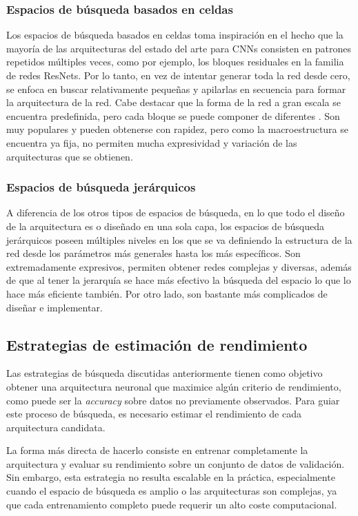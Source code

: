 \subsubsection{Espacios de búsqueda basados en celdas}
Los espacios de búsqueda basados en celdas toma inspiración en el hecho que la mayoría de las arquitecturas del estado del arte para CNNs consisten en patrones repetidos múltiples veces, como por ejemplo, los bloques residuales en la familia de redes ResNets. Por lo tanto, en vez de intentar generar toda la red desde cero, se enfoca en buscar  relativamente pequeñas y apilarlas en secuencia para formar la arquitectura de la red. Cabe destacar que la forma de la red a gran escala se encuentra predefinida, pero cada bloque se puede componer de diferentes . Son muy populares y pueden obtenerse con rapidez, pero como la macroestructura se encuentra ya fija, no permiten mucha expresividad y variación de las arquitecturas que se obtienen.

\subsubsection{Espacios de búsqueda jerárquicos}
A diferencia de los otros tipos de espacios de búsqueda, en lo que todo el diseño de la arquitectura es  o diseñado en una sola capa, los espacios de búsqueda jerárquicos poseen múltiples niveles en los que se va definiendo la estructura de la red desde los parámetros más generales hasta los más específicos. Son extremadamente expresivos, permiten obtener redes complejas y diversas, además de que al tener la jerarquía se hace más efectivo la búsqueda del espacio lo que lo hace más eficiente también. Por otro lado, son bastante más complicados de diseñar e implementar.

\subsection{Estrategias de estimación de rendimiento}
Las estrategias de búsqueda discutidas anteriormente tienen como objetivo obtener una arquitectura neuronal que maximice algún criterio de rendimiento, como puede ser la \textit{accuracy} sobre datos no previamente observados. Para guiar este proceso de búsqueda, es necesario estimar el rendimiento de cada arquitectura candidata.

La forma más directa de hacerlo consiste en entrenar completamente la arquitectura y evaluar su rendimiento sobre un conjunto de datos de validación. Sin embargo, esta estrategia no resulta escalable en la práctica, especialmente cuando el espacio de búsqueda es amplio o las arquitecturas son complejas, ya que cada entrenamiento completo puede requerir un alto coste computacional.

